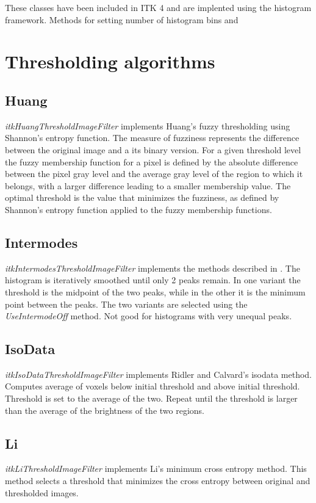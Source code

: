\documentclass{InsightArticle}
\begin{document}
These classes have been included in ITK 4 and are implented using the
histogram framework. Methods for setting number of histogram bins and 

\section{Thresholding algorithms}
\subsection{Huang}
{\em itkHuangThresholdImageFilter} implements Huang's fuzzy
thresholding using Shannon's entropy
function\cite{huang1995image}. The measure of fuzziness represents the
difference between the original image and a its binary version. For a
given threshold level the fuzzy membership function for a pixel is defined by the
absolute difference between the pixel gray level and the average gray
level of the region to which it belongs, with a larger difference
leading to a smaller membership value. The optimal threshold is
the value that minimizes the fuzziness, as defined by Shannon's
entropy function applied to the fuzzy membership functions.

\subsection{Intermodes}
{\em itkIntermodesThresholdImageFilter} implements the methods
described in \cite{prewitt1965analysis}. The histogram is iteratively
smoothed until only 2 peaks remain. In one variant the threshold is
the midpoint of the two peaks, while in the other it is the minimum
point between the peaks. The two variants are selected using the {\em
  UseIntermodeOff} method. Not good for histograms with very unequal
peaks.
\subsection{IsoData}
{\em itkIsoDataThresholdImageFilter} implements Ridler and Calvard's
\cite{ridler1978picture} isodata method. 
Computes average of voxels below initial threshold and above initial
threshold. Threshold is set to the average of the two. Repeat until
the threshold is larger than the average of the brightness of the two regions.

\subsection{Li}
 {\em itkLiThresholdImageFilter} implements Li's minimum cross entropy
 method\cite{li1993minimum,li1998iterative}. This method selects a
 threshold that minimizes the cross entropy between original and
 thresholded images.
\end{document}
